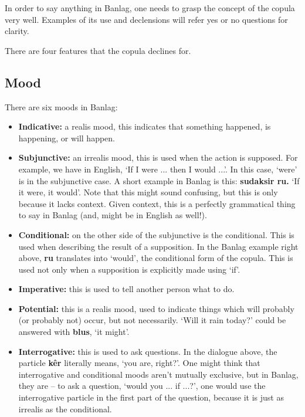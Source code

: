 \documentclass[12pt]{report}
\begin{document}
In order to say anything in Banlag, one needs to grasp the concept of the copula very well. Examples of its use and declensions will refer yes or no questions for clarity. 

There are four features that the copula declines for. 

\subsection{Mood}

There are six moods in Banlag:

\begin{itemize}
\item \textbf{Indicative:} a realis mood, this indicates that something happened, is happening, or will happen.
\item \textbf{Subjunctive:} an irrealis mood, this is used when the action is supposed. For example, we have in English, `If I were ... then I would ...'. In this case, `were' is in the subjunctive case. A short example in Banlag is this: \textbf{sudaksir ru.} `If it were, it would'. Note that this might sound confusing, but this is only because it lacks context. Given context, this is a perfectly grammatical thing to say in Banlag (and, might be in English as well!).
\item \textbf{Conditional:} on the other side of the subjunctive is the conditional. This is used when describing the result of a supposition. In the Banlag example right above, \textbf{ru} translates into `would', the conditional form of the copula. This is used not only when a supposition is explicitly made using `if'.
\item \textbf{Imperative:} this is used to tell another person what to do.
\item \textbf{Potential:} this is a realis mood, used to indicate things which will probably (or probably not) occur, but not necessarily. `Will it rain today?' could be answered with \textbf{blus}, `it might'.
\item \textbf{Interrogative:} this is used to ask questions. In the dialogue above, the particle \textbf{k\^ er} literally means, `you are, right?'. One might think that interrogative and conditional moods aren't mutually exclusive, but in Banlag, they are -- to ask a question, `would you ... if ...?', one would use the interrogative particle in the first part of the question, because it is just as irrealis as the conditional.
\end{itemize}
\end{document}
